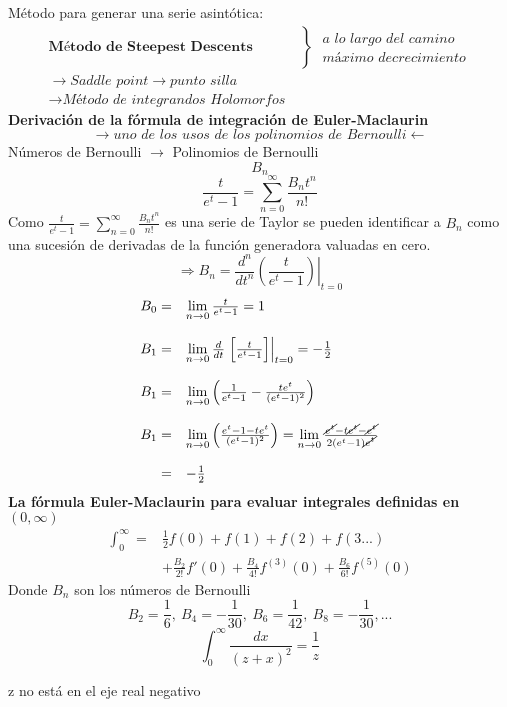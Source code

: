 \documentclass{article}
\theoremstyle{definition}
\begin{document}
Método para generar una serie asintótica:
\[\begin{array}{ll}
	\textbf{Método de Steepest Descents}
	&\left\}\begin{array}{ll}
		\textit{a lo largo del camino}\\
		\textit{máximo decrecimiento}	
	\end{array}\right.\\
	\to \textit{Saddle point}\to \textit{punto silla}\\
	\to \textit{Método de integrandos Holomorfos}
\end{array}\]
\textbf{Derivación de la fórmula de integración de Euler-Maclaurin}
\[\longrightarrow \textit{uno de los usos de los polinomios de Bernoulli}\longleftarrow\]
Números de Bernoulli $\longrightarrow$ Polinomios de Bernoulli
\[B_n\]
\[\frac{t}{e^t-1}=\sum^{\infty}_{n=0}\frac{B_nt^n}{n!}\]
Como $\frac{t}{e^t-1}=\sum^{\infty}_{n=0}\frac{B_nt^n}{n!}$ es una serie de Taylor se pueden identificar a $B_n$ como una sucesión de derivadas de la función generadora valuadas en cero.
\[\Rightarrow B_n=\frac{d^n}{dt^n}\left.\left(\frac{t}{e^t-1}\right)\right|_{t=0}\]
\[
\begin{array}{rl}
	B_0=&\lim\limits_{n\to 0}\frac{t}{e^t-1}=1\\
	\\
	B_1=&\lim\limits_{n\to 0}\frac{d}{dt}\left.\left[\frac{t}{e^t-1}\right]\right|_{t=0}=-\frac{1}{2}\\
	\\
	B_1=& \lim\limits_{n\to 0}\left(\frac{1}{e^t-1}-\frac{te^t}{(e^t-1)^2}\right)\\
	\\
	B_1=& \lim\limits_{n\to 0}\left(\frac{e^t-1-te^t}{(e^t-1)^2}\right)=\lim\limits_{n\to 0}\frac{\cancel{e^t}-t\cancel{e^t}-\cancel{e^t}}{2(e^t-1)\cancel{e^t}}\\
	\\
	=& -\frac{1}{2}
\end{array}\]
\textbf{La fórmula Euler-Maclaurin para evaluar integrales definidas en $(0,\infty)$}
\[
\begin{array}{rl}
	\int^{\infty}_0=&\frac{1}{2}f(0)+f(1)+f(2)+f(3...)\\
	&+\frac{B_2}{2!}f'(0)+\frac{B_4}{4!}f^{(3)}(0)+\frac{B_6}{6!}f^{(5)}(0)
\end{array}\]
Donde $B_n$ son los números de Bernoulli
\[B_2=\frac{1}{6},\ B_4=-\frac{1}{30},\ B_6=\frac{1}{42},\ B_8=-\frac{1}{30},...\]
\[\int^{\infty}_0\frac{dx}{(z+x)^2}=\frac{1}{z}\]
\begin{center}
	z no está en el eje real negativo
\end{center}
\end{document}
